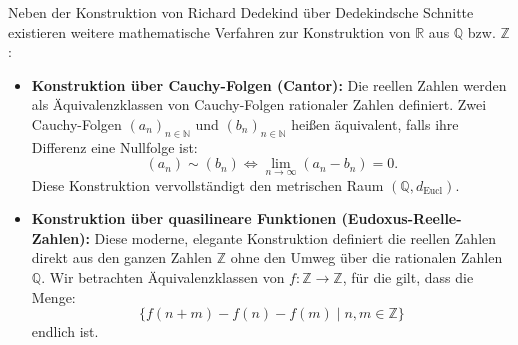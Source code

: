 \begin{math-stroke}
Neben der Konstruktion von Richard Dedekind über Dedekindsche Schnitte existieren weitere mathematische Verfahren zur Konstruktion von $\mathbb{R}$ aus $\mathbb{Q}$ bzw. $\mathbb{Z}$:

\begin{itemize}
    \item \textbf{Konstruktion über Cauchy-Folgen (Cantor):}
    Die reellen Zahlen werden als Äquivalenzklassen von Cauchy-Folgen rationaler Zahlen definiert. Zwei Cauchy-Folgen $(a_n)_{n \in \mathbb{N}}$ und $(b_n)_{n \in \mathbb{N}}$ heißen äquivalent, falls ihre Differenz eine Nullfolge ist:
    \[
    (a_n) \sim (b_n) \iff \lim_{n \to \infty} (a_n - b_n) = 0.
    \]
    Diese Konstruktion vervollständigt den metrischen Raum $(\mathbb{Q}, d_{\text{Eucl}})$.

    \item \textbf{Konstruktion über quasilineare Funktionen (Eudoxus-Reelle-Zahlen):}
    Diese moderne, elegante Konstruktion definiert die reellen Zahlen direkt aus den ganzen Zahlen $\mathbb{Z}$ ohne den Umweg über die rationalen Zahlen $\mathbb{Q}$. Wir betrachten Äquivalenzklassen von  $f \colon \mathbb{Z} \to \mathbb{Z}$, für die gilt, dass die Menge:
    \[
    \{ f(n+m) - f(n) - f(m) \mid n, m \in \mathbb{Z} \}
    \]
    endlich ist.
\end{itemize}
\end{math-stroke}

